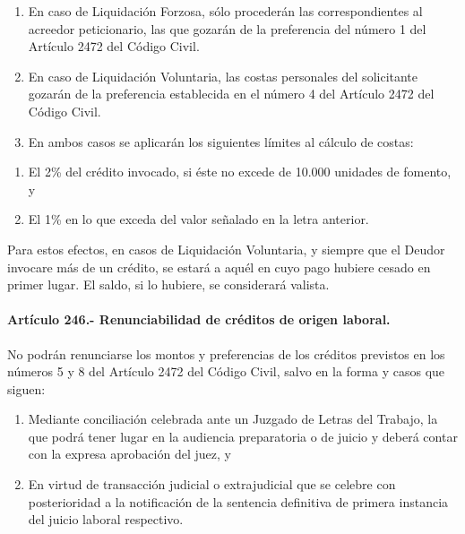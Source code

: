 \documentclass[
]{book}
\begin{document}
\begin{enumerate}
\def\labelenumi{\arabic{enumi})}
\item
  En caso de Liquidación Forzosa, sólo procederán las correspondientes al acreedor peticionario, las que gozarán de la preferencia del número 1 del Artículo 2472 del Código Civil.
\item
  En caso de Liquidación Voluntaria, las costas personales del solicitante gozarán de la preferencia establecida en el número 4 del Artículo 2472 del Código Civil.
\item
  En ambos casos se aplicarán los siguientes límites al cálculo de costas:
\end{enumerate}

\begin{enumerate}
\def\labelenumi{\alph{enumi})}
\item
  El 2\% del crédito invocado, si éste no excede de 10.000 unidades de fomento, y
\item
  El 1\% en lo que exceda del valor señalado en la letra anterior.
\end{enumerate}

Para estos efectos, en casos de Liquidación Voluntaria, y siempre que el Deudor invocare más de un crédito, se estará a aquél en cuyo pago hubiere cesado en primer lugar. El saldo, si lo hubiere, se considerará valista.

\hypertarget{artuxedculo-246.--renunciabilidad-de-cruxe9ditos-de-origen-laboral.}{%
\paragraph*{Artículo 246.- Renunciabilidad de créditos de origen laboral.}\label{artuxedculo-246.--renunciabilidad-de-cruxe9ditos-de-origen-laboral.}}

No podrán renunciarse los montos y preferencias de los créditos previstos en los números 5 y 8 del Artículo 2472 del Código Civil, salvo en la forma y casos que siguen:

\begin{enumerate}
\def\labelenumi{\arabic{enumi})}
\item
  Mediante conciliación celebrada ante un Juzgado de Letras del Trabajo, la que podrá tener lugar en la audiencia preparatoria o de juicio y deberá contar con la expresa aprobación del juez, y
\item
  En virtud de transacción judicial o extrajudicial que se celebre con posterioridad a la notificación de la sentencia definitiva de primera instancia del juicio laboral respectivo.
\end{enumerate}
\end{document}
